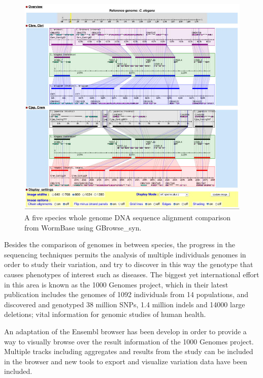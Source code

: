 \begin{figure}  
\centering
\includegraphics[width=\textwidth]{figures/gbrowse_syn.jpg}
\caption[multiple alignment snapshot generated with GBrowse\_syn.]{A five species whole genome DNA sequence alignment comparison from WormBase using GBrowse\_syn.
\label{fig:gbrowsesyn}}
\end{figure}

Besides the comparison of genomes in between species, the progress in the sequencing techniques permits the analysis of multiple individuals genomes in order to study their variation, and try to discover in this way the genotype that causes phenotypes of interest such as diseases. The biggest yet international effort in this area is known as the 1000 Genomes project,  which in their latest publication \cite{GEN2012} includes the genomes of 1092 individuals from 14 populations, and discovered and genotyped 38 million SNPs, 1.4 million indels and 14000 large deletions; vital information for genomic studies of human health.

An adaptation of the Ensembl browser has been develop in order to provide a way to visually browse over the result information of the 1000 Genomes project. Multiple tracks including aggregates and results from the study can be included in the browser and new tools to export and visualize variation data have been included.

